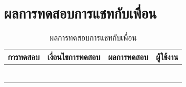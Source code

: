 \section{ผลการทดสอบการแชทกับเพื่อน}
\begin{table}[H]
	\caption{ผลการทดสอบการแชทกับเพื่อน}
    \centering	
	\label{tab:test25}
    \begin{tabular}{ | p{4cm} | p{4cm} | p{4cm} | p{2cm} | }
		\hline
	\multicolumn{1}{|c|}{การทดสอบ} & \multicolumn{1}{c|}{เงื่อนไขการทดสอบ} & \multicolumn{1}{c|}{ผลการทดสอบ} & \multicolumn{1}{c|}{ผู้ใช้งาน}                             \\ \hline
	\setstretch{1.0}{ทดสอบการแชทกับเพื่อน}
	& \setstretch{1.0}{ผู้ใช้ไม่กรอกข้อความ และกดส่งข้อความ}
	& \setstretch{1.0}{ระบบจะไม่ส่งข้อความ} 
	&\setstretch{1.0}{\begin{flushleft}ผู้ใช้งาน\end{flushleft}} \\ \cline{2-3} 
	& \setstretch{1.0}{ผู้ใช้กรอกข้อความ และส่งข้อความ}
	& \setstretch{1.0}{ระบบจะส่งข้อความ } 
	&\setstretch{1.0}{}\\ \cline{2-3} 
	& \setstretch{1.0}{ผู้ใช้เลือกรูปและกรอกข้อความ จากนั้นส่งข้อความ}
	& \setstretch{1.0}{ระบบจะส่งรูปและข้อความ และแสดงรูปและข้อความ } 
	&\setstretch{1.0}{}\\ \cline{2-3} 
	& \setstretch{1.0}{ผู้ใช้เลือกรูปและไม่กรอกข้อความ จากนั้นส่งข้อความ}
	& \setstretch{1.0}{ระบบจะส่งรูป และแสดงรูป } 
	&\setstretch{1.0}{}\\ \cline{2-3} 
	& \setstretch{1.0}{ผู้ใช้เลือกปุ่มลบข้อความ}
	& \setstretch{1.0}{ระบบจะลบข้อความ } 
	&\setstretch{1.0}{}\\ \cline{2-3} 
	& \setstretch{1.0}{ผู้ใช้เลือกปุ่มลบข้อความทั้งหมด}
	& \setstretch{1.0}{ระบบจะลบข้อความทั้งหมดระหว่างผู้ใช้งาน } 
	&\setstretch{1.0}{}\\ \cline{2-3} \hline
    \end{tabular}
\end{table}


